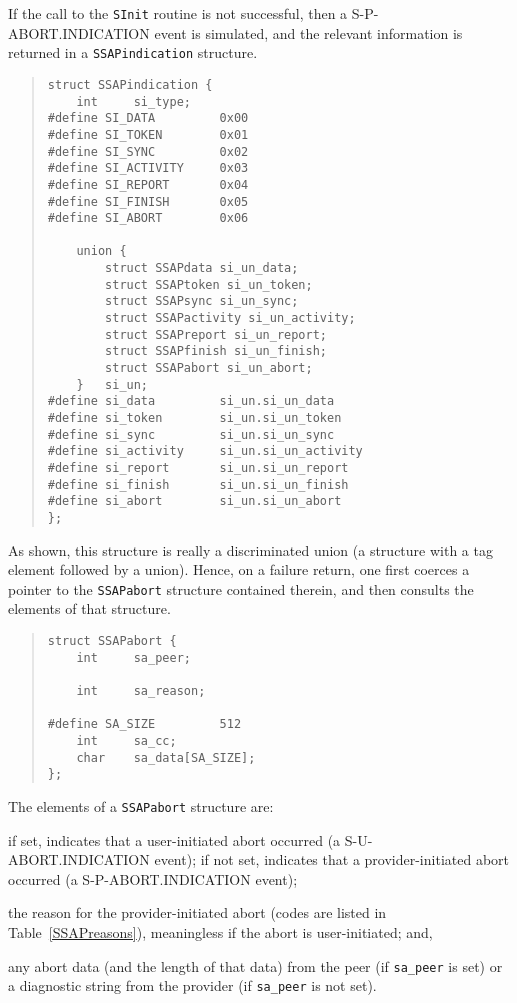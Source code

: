If the call to the \verb"SInit" routine is not successful,
then a {\sf S-P-ABORT.IN\-DI\-CA\-TION\/} event is simulated,
and the relevant information is returned in a \verb"SSAPindication"
structure.\label{SSAPindication}
\begin{quote}\small\begin{verbatim}
struct SSAPindication {
    int     si_type;
#define SI_DATA         0x00
#define SI_TOKEN        0x01
#define SI_SYNC         0x02
#define SI_ACTIVITY     0x03
#define SI_REPORT       0x04
#define SI_FINISH       0x05
#define SI_ABORT        0x06

    union {
        struct SSAPdata si_un_data;
        struct SSAPtoken si_un_token;
        struct SSAPsync si_un_sync;
        struct SSAPactivity si_un_activity;
        struct SSAPreport si_un_report;
        struct SSAPfinish si_un_finish;
        struct SSAPabort si_un_abort;
    }   si_un;
#define si_data         si_un.si_un_data
#define si_token        si_un.si_un_token
#define si_sync         si_un.si_un_sync
#define si_activity     si_un.si_un_activity
#define si_report       si_un.si_un_report
#define si_finish       si_un.si_un_finish
#define si_abort        si_un.si_un_abort
};
\end{verbatim}\end{quote}
As shown, this structure is really a discriminated union
(a structure with a tag element followed by a union).
Hence, on a failure return,
one first coerces a pointer to the \verb"SSAPabort" structure contained
therein,
and then consults the elements of that structure.
\begin{quote}\small\begin{verbatim}
struct SSAPabort {
    int     sa_peer;

    int     sa_reason;

#define SA_SIZE         512
    int     sa_cc;
    char    sa_data[SA_SIZE];
};
\end{verbatim}\end{quote}
The elements of a \verb"SSAPabort" structure are:
\begin{describe}
\item[\verb"sa\_peer":] if set, indicates that a user-initiated abort occurred
(a {\sf S-U-ABORT.INDICATION\/} event);
if not set, indicates that a provider-initiated abort occurred
(a {\sf S-P-ABORT.INDICATION\/} event);

\item[\verb"sa\_reason":] the reason for the provider-initiated abort
(codes are listed in Table~\ref{SSAPreasons}),
meaningless if the abort is user-initiated;
and,

\item[\verb"sa\_data"/\verb"sa\_cc":] any abort data (and the length of that
data) from the peer (if \verb"sa_peer" is set) or
a diagnostic string from the provider (if \verb"sa_peer" is not set).
\end{describe}
